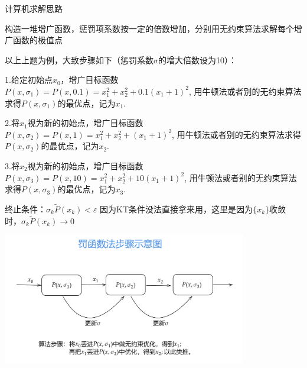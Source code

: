 \documentclass[cn]{elegantbook}
\begin{document}
\begin{note}
\begin{center}
  \textcolor[rgb]{0.33,0.33,1.00}{\Large 计算机求解思路}
\end{center}
构造一堆增广函数，惩罚项系数按一定的倍数增加，分别用无约束算法求解每个增广函数的极值点
\vspace{10pt}

以上上题为例，大致步骤如下（惩罚系数$\sigma$的增大倍数设为10）：
\vspace{7pt}

1.给定初始点$x_0$，增广目标函数$P(x, \sigma_1)=P(x, 0.1)=x_{1}^{2}+x_{2}^{2}+0.1\left(x_{1}+1\right)^{2}$,
用牛顿法或者别的无约束算法求得$P(x, \sigma_1)$的最优点，记为$x_1$.

2.将$x_1$视为新的初始点，增广目标函数$P(x, \sigma_2)=P(x, 1)=x_{1}^{2}+x_{2}^{2}+\left(x_{1}+1\right)^{2}$,
用牛顿法或者别的无约束算法求得$P(x, \sigma_2)$的最优点，记为$x_2$.

3.将$x_2$视为新的初始点，增广目标函数$P(x, \sigma_3)=P(x, 10)=x_{1}^{2}+x_{2}^{2}+10\left(x_{1}+1\right)^{2}$,
用牛顿法或者别的无约束算法求得$P(x, \sigma_3)$的最优点，记为$x_3$.
\vspace{7pt}

终止条件：$ \sigma_{k} \tilde{P}\left(x_{k}\right)<\varepsilon $ \quad \quad 因为KT条件没法直接拿来用，这里是因为$\{x_k\}$收敛时，$  \sigma_{k} \tilde{P}\left(x_{k}\right) \rightarrow 0 $

\centerline{\includegraphics[width=0.8\textwidth]{fig3}}

\end{note}
\newpage
\end{document}
